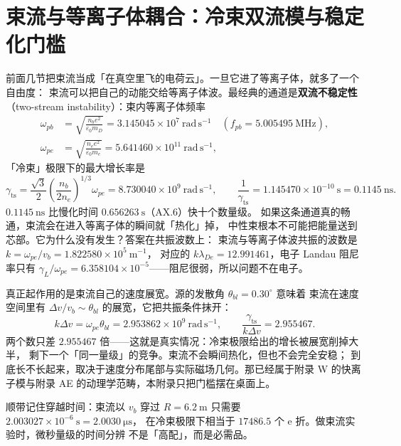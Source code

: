 \section{束流与等离子体耦合：冷束双流模与稳定化门槛}
\label{sec:app-ax-coupling}

前面几节把束流当成「在真空里飞的电荷云」。一旦它进了等离子体，就多了一个自由度：
束流可以把自己的动能交给等离子体波。最经典的通道是\textbf{双流不稳定性}
（two-stream instability）：束内等离子体频率
\begin{equation}
\begin{aligned}
\omega_{pb}&=\sqrt{\frac{n_be^2}{\varepsilon_0m_D}}=3.145045\times10^{7}\ \mathrm{rad\,s^{-1}}
\quad(f_{pb}=5.005495\ \mathrm{MHz}),\\
\omega_{pe}&=\sqrt{\frac{n_ee^2}{\varepsilon_0m_e}}=5.641460\times10^{11}\ \mathrm{rad\,s^{-1}},
\end{aligned}
\label{eq:app-ax-wp}
\end{equation}
「冷束」极限下的最大增长率是
\begin{equation}
\gamma_\mathrm{ts}=\frac{\sqrt{3}}{2}\left(\frac{n_b}{2n_e}\right)^{1/3}\omega_{pe}
=8.730040\times10^{9}\ \mathrm{rad\,s^{-1}},
\qquad
\frac{1}{\gamma_\mathrm{ts}}=1.145470\times10^{-10}\ \mathrm{s}=0.1145\ \mathrm{ns}.
\label{eq:app-ax-ts}
\end{equation}
$0.1145\ \mathrm{ns}$ 比慢化时间 $0.656263\ \mathrm{s}$（AX.6）快十个数量级。
如果这条通道真的畅通，束流会在进入等离子体的瞬间就「热化」掉，
中性束根本不可能把能量送到芯部。它为什么没有发生？答案在共振波数上：
束流与等离子体波共振的波数是 $k=\omega_{pe}/v_b=1.822580\times10^{5}\ \mathrm{m^{-1}}$，
对应的 $k\lambda_{De}=12.991461$，电子 Landau 阻尼率只有
$\gamma_L/\omega_{pe}=6.358104\times10^{-5}$——阻尼很弱，所以问题不在电子。

真正起作用的是束流自己的速度展宽。源的发散角 $\theta_{bl}=0.30^\circ$ 意味着
束流在速度空间里有 $\Delta v/v_b\sim\theta_{bl}$ 的展宽，它把共振条件抹开：
\begin{equation}
k\Delta v=\omega_{pe}\theta_{bl}=2.953862\times10^{9}\ \mathrm{rad\,s^{-1}},
\qquad
\frac{\gamma_\mathrm{ts}}{k\Delta v}=2.955467.
\label{eq:app-ax-kdv}
\end{equation}
两个数只差 $2.955467$ 倍——这就是真实情况：冷束极限给出的增长被展宽削掉大半，
剩下一个「同一量级」的竞争。束流不会瞬间热化，但也不会完全安稳；
到底长不长起来，取决于速度分布尾部与实际磁场几何。那已经属于附录 W
的快离子模与附录 AE 的动理学范畴，本附录只把门槛摆在桌面上。

顺带记住穿越时间：束流以 $v_b$ 穿过 $R=6.2\ \mathrm{m}$ 只需要
$2.003027\times10^{-6}\ \mathrm{s}=2.0030\ \mathrm{\mu s}$，
在冷束极限下相当于 $17486.5$ 个 e 折。做束流实验时，微秒量级的时间分辨
不是「高配」，而是必需品。

